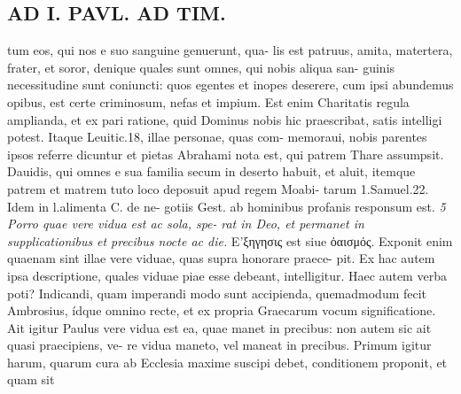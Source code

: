 \documentclass{article}
\begin{document}
\begin{pages}
\section*{AD I. PAVL. AD TIM. }
\marginpar{[ p.256 ]}tum eos, qui nos e suo sanguine genuerunt, qua- lis est patruus, amita, matertera, frater, et soror, denique quales sunt omnes, qui nobis aliqua san- guinis necessitudine sunt coniuncti: quos egentes et inopes deserere, cum ipsi abundemus opibus, est certe criminosum, nefas et impium. Est enim Charitatis regula amplianda, et ex pari ratione, quid Dominus nobis hic praescribat, satis intelligi potest. Itaque Leuitic.18, illae personae, quas com- memoraui, nobis parentes ipsos referre dicuntur et pietas Abrahami nota est, qui patrem Thare assumpsit. Dauidis, qui omnes e sua familia secum in deserto habuit, et aluit, itemque patrem et matrem tuto loco deposuit apud regem Moabi- tarum 1.Samuel.22. Idem in l.alimenta C. de ne- gotiis Gest. ab hominibus profanis responsum est. \textit{5 Porro quae vere vidua est ac sola, spe-} \textit{rat in Deo, et permanet in supplicationibus} \textit{et precibus nocte ac die.} Ε’ξηγησις est siue ὀαισμός. Exponit enim quaenam sint illae vere viduae, quas supra honorare praece- pit. Ex hac autem ipsa descriptione, quales viduae piae esse debeant, intelligitur. Haec autem verba poti? Indicandi, quam imperandi modo sunt accipienda, quemadmodum fecit Ambrosius, ídque omnino recte, et ex propria Graecarum vocum significatione. Ait igitur Paulus vere vidua est ea, quae manet in precibus: non autem sic ait quasi praecipiens, ve- re vidua maneto, vel maneat in precibus. Primum igitur harum, quarum cura ab Ecclesia maxime suscipi debet, conditionem proponit, et quam sit 

\end{pages}
\end{document}
